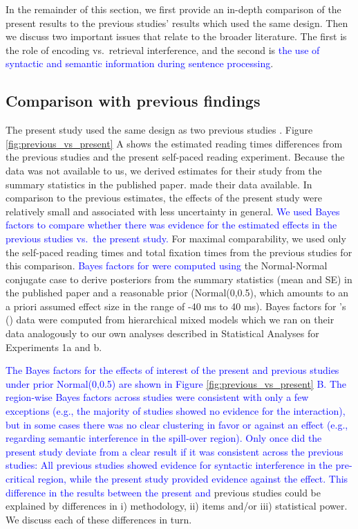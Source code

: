 \documentclass[review,preprint,12pt,authoryear,floatsintext]{elsarticle}
\begin{document}
{In the remainder of this section, we first provide an in-depth comparison of the present results to the previous studies' results which used the same design. Then we discuss two important issues that relate to the broader literature. The first is the role of encoding vs.\ retrieval interference, and the second is \textcolor{blue}{the use of syntactic and semantic information during sentence processing}.

\subsection*{Comparison with previous findings}\label{comparison}
{The present study used the same design as two previous studies \citep{vandyke07, mertzen}. Figure \ref{fig:previous_vs_present} A shows the estimated reading times differences from the previous studies and the present self-paced reading experiment. Because the \cite{vandyke07} data was not available to us, we derived estimates for their study from the summary statistics in the published paper. \cite{mertzen} made their data available. In comparison to the previous estimates, the effects of the present study were relatively small and associated with less uncertainty in general. \textcolor{blue}{We used Bayes factors to compare whether there was evidence for the estimated effects in the previous studies vs.\ the present study.} For maximal comparability, we used only the self-paced reading times and total fixation times from the previous studies for this comparison. \textcolor{blue}{Bayes factors for \cite{vandyke07} were computed using} the Normal-Normal conjugate case \citep{lee2012bayesian} to derive posteriors from the summary statistics (mean and SE) in the published paper and a reasonable prior (Normal(0,0.5), which amounts to an a priori assumed effect size in the range of -40 ms to 40 ms). Bayes factors for \citeauthor{mertzen}'s (\citeyear{mertzen}) data were computed from hierarchical mixed models which we ran on their data analogously to our own analyses described in Statistical Analyses for Experiments 1a and b. 

\textcolor{blue}{The Bayes factors for the effects of interest of the present and previous studies under prior Normal(0,0.5) are shown in Figure \ref{fig:previous_vs_present} B. The region-wise Bayes factors across studies were consistent with only a few exceptions (e.g., the majority of studies showed no evidence for the interaction), but in some cases there was no clear clustering in favor or against an effect (e.g., regarding semantic interference in the spill-over region). Only once did the present study deviate from a clear result if it was consistent across the previous studies: All previous studies showed evidence for syntactic interference in the pre-critical region, while the present study provided evidence against the effect. This difference in the results between the present and} previous studies could be explained by differences in i) methodology, ii) items and/or iii) statistical power. We discuss each of these differences in turn.

}}
\end{document}

